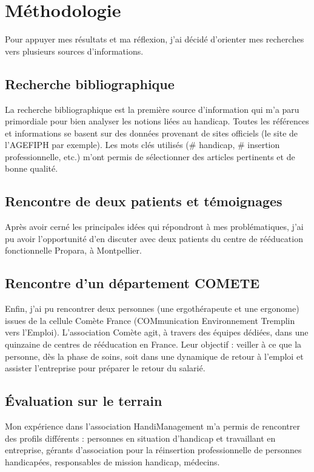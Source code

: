 \chapter{Méthodologie}

Pour appuyer mes résultats et ma réflexion, j'ai décidé d'orienter mes recherches vers plusieurs sources d'informations.

\section{Recherche bibliographique}
La recherche bibliographique est la première source d'information qui m'a paru primordiale pour bien analyser les notions liées au handicap. Toutes les références et informations se basent sur des données provenant de sites officiels (le site de l'AGEFIPH par exemple). Les mots clés utilisés (\# handicap, \# insertion professionnelle, etc.) m'ont permis de sélectionner des articles pertinents et de bonne qualité.

\section{Rencontre de deux patients et témoignages}
Après avoir cerné les principales idées qui répondront à mes problématiques, j'ai pu avoir l'opportunité d'en discuter avec deux patients du centre de rééducation fonctionnelle Propara, à Montpellier.

\section{Rencontre d'un département COMETE}
Enfin, j'ai pu rencontrer deux personnes (une ergothérapeute et une ergonome) issues de la cellule Comète France (COMmunication Environnement Tremplin vers l'Emploi). L'association Comète agit, à travers des équipes dédiées, dans une quinzaine de centres de rééducation en France. Leur objectif : veiller à ce que la personne, dès la phase de soins, soit dans une dynamique de retour à l'emploi et assister l'entreprise pour préparer le retour du salarié.

\section{Évaluation sur le terrain}
Mon expérience dans l'association HandiManagement m'a permis de rencontrer des profils différents : personnes en situation d'handicap et travaillant en entreprise, gérants d'association pour la réinsertion professionnelle de personnes handicapées, responsables de mission handicap, médecins.